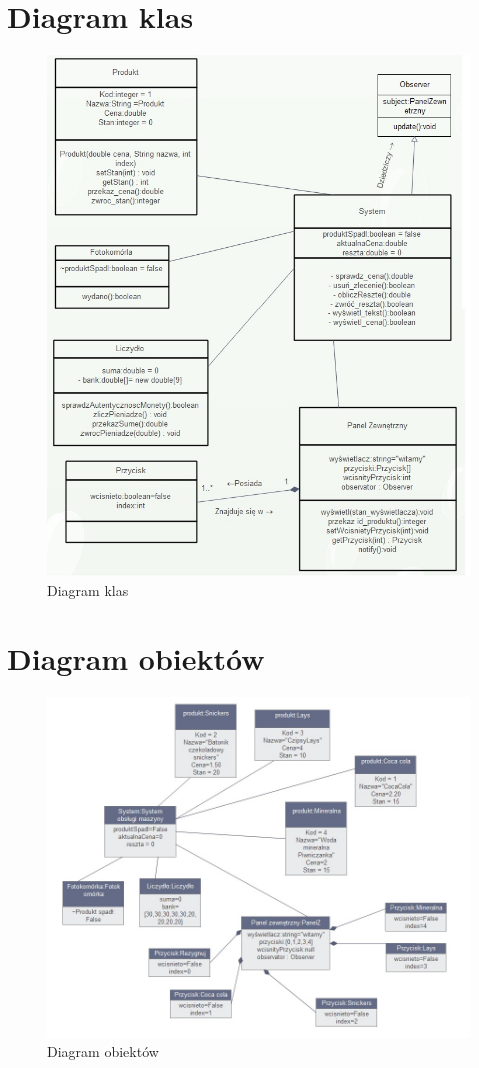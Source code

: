 \documentclass[a4paper, 11pt]{article}
\begin{document}
\section{Diagram klas}
\begin{figure}[H]
\centerline{\includegraphics[scale=0.7]{../Diagrams/diagramKlas2}}
\caption{Diagram klas}
\end{figure}


\section{Diagram obiektów}
\begin{figure}[H]
\includegraphics[scale=0.6]{../Diagrams/diagramObiektow2}
\caption{Diagram obiektów}
\end{figure}


%
%
\end{document}
